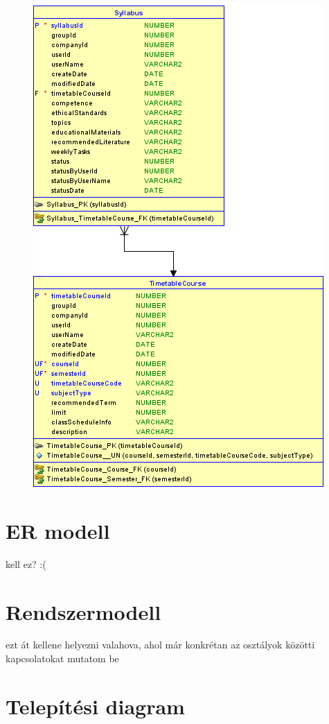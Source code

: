 \documentclass[hidelinks, 12pt, a4paper]{report}
\begin{document}
\begin{figure}
    \centering
	\includegraphics{syllabus_data_model_part3.png}
\end{figure}

\section{ER modell}

kell ez? :(

\section{Rendszermodell}

ezt át kellene helyezni valahova, ahol már konkrétan az osztályok közötti kapcsolatokat mutatom be

\section{Telepítési diagram}
\end{document}
